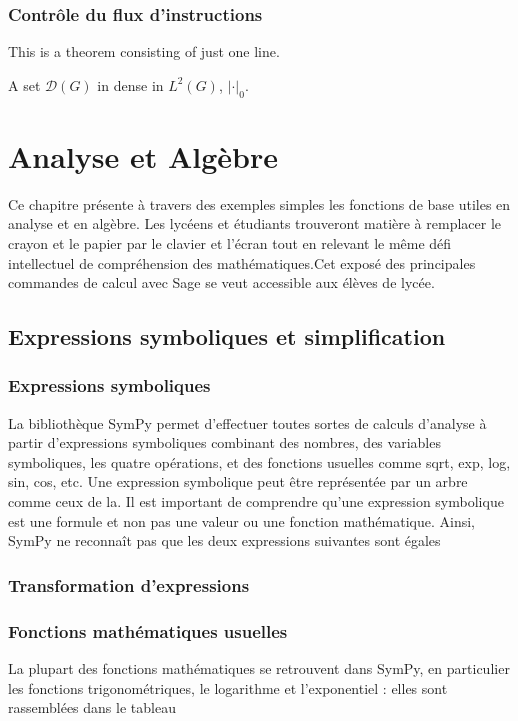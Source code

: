 \subsection{Contrôle du flux d’instructions}
This is a theorem consisting of just one line.

\begin{exercise}
A set $\mathcal{D}(G)$ in dense in $L^2(G)$, $|\cdot|_0$. 
\end{exercise}
\begin{solution}
\end{solution}

\chapter{Analyse et Algèbre}
Ce chapitre présente à travers des exemples simples les fonctions de base utiles en analyse et en algèbre. Les 
lycéens et étudiants trouveront matière à  remplacer le crayon et le papier par le clavier et l'écran tout en 
relevant le même défi intellectuel de compréhension des mathématiques.Cet exposé des principales commandes de calcul 
avec Sage se veut accessible aux élèves de lycée.

\section{Expressions symboliques et simplification}
 \subsection{Expressions symboliques}
La bibliothèque SymPy permet d'effectuer toutes sortes de calculs d'analyse à partir d'expressions
symboliques combinant des nombres, des variables symboliques, les quatre opérations, et des fonctions usuelles comme 
sqrt, exp, log, sin, cos, etc. Une expression symbolique peut être représentée par un arbre comme ceux de la. Il est 
important de comprendre qu'une expression symbolique est une formule et non pas une valeur ou une fonction 
mathématique. Ainsi, SymPy ne reconnaît pas que les deux expressions suivantes sont égales
\subsection{Transformation d'expressions}
\subsection{Fonctions mathématiques usuelles}
La plupart des fonctions mathématiques se retrouvent dans SymPy, en particulier les
fonctions trigonométriques, le logarithme et l'exponentiel : elles sont rassemblées
dans le tableau

